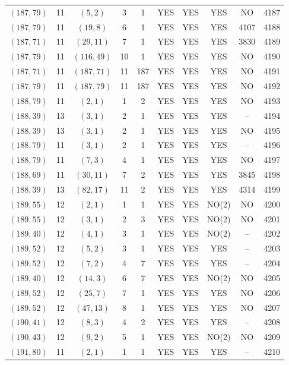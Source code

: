 \begin{longtable}{|c|c|c|c|c|c|c|c|c|c|}
$(187, 79)$ & 11 & $(5, 2)$ & 3 & 1 & YES & YES & YES & NO & 4187\\
$(187, 79)$ & 11 & $(19, 8)$ & 6 & 1 & YES & YES & YES & 4107 & 4188\\
$(187, 71)$ & 11 & $(29, 11)$ & 7 & 1 & YES & YES & YES & 3830 & 4189\\
$(187, 79)$ & 11 & $(116, 49)$ & 10 & 1 & YES & YES & YES & NO & 4190\\
$(187, 71)$ & 11 & $(187, 71)$ & 11 & 187 & YES & YES & YES & NO & 4191\\
$(187, 79)$ & 11 & $(187, 79)$ & 11 & 187 & YES & YES & YES & NO & 4192\\
$(188, 79)$ & 11 & $(2, 1)$ & 1 & 2 & YES & YES & YES & NO & 4193\\
$(188, 39)$ & 13 & $(3, 1)$ & 2 & 1 & YES & YES & YES & -- & 4194\\
$(188, 39)$ & 13 & $(3, 1)$ & 2 & 1 & YES & YES & YES & NO & 4195\\
$(188, 79)$ & 11 & $(3, 1)$ & 2 & 1 & YES & YES & YES & -- & 4196\\
$(188, 79)$ & 11 & $(7, 3)$ & 4 & 1 & YES & YES & YES & NO & 4197\\
$(188, 69)$ & 11 & $(30, 11)$ & 7 & 2 & YES & YES & YES & 3845 & 4198\\
$(188, 39)$ & 13 & $(82, 17)$ & 11 & 2 & YES & YES & YES & 4314 & 4199\\
$(189, 55)$ & 12 & $(2, 1)$ & 1 & 1 & YES & YES & NO(2) & NO & 4200\\
$(189, 55)$ & 12 & $(3, 1)$ & 2 & 3 & YES & YES & NO(2) & NO & 4201\\
$(189, 40)$ & 12 & $(4, 1)$ & 3 & 1 & YES & YES & NO(2) & -- & 4202\\
$(189, 52)$ & 12 & $(5, 2)$ & 3 & 1 & YES & YES & YES & -- & 4203\\
$(189, 52)$ & 12 & $(7, 2)$ & 4 & 7 & YES & YES & YES & -- & 4204\\
$(189, 40)$ & 12 & $(14, 3)$ & 6 & 7 & YES & YES & NO(2) & NO & 4205\\
$(189, 52)$ & 12 & $(25, 7)$ & 7 & 1 & YES & YES & YES & NO & 4206\\
$(189, 52)$ & 12 & $(47, 13)$ & 8 & 1 & YES & YES & YES & NO & 4207\\
$(190, 41)$ & 12 & $(8, 3)$ & 4 & 2 & YES & YES & YES & -- & 4208\\
$(190, 43)$ & 12 & $(9, 2)$ & 5 & 1 & YES & YES & NO(2) & NO & 4209\\
$(191, 80)$ & 11 & $(2, 1)$ & 1 & 1 & YES & YES & YES & -- & 4210\\

\end{longtable}

